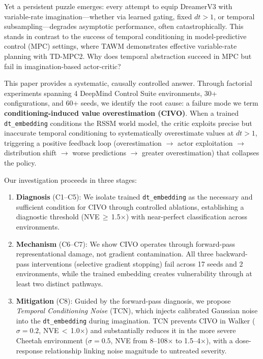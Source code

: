 \documentclass[10pt,letterpaper]{article}
\begin{document}
Yet a persistent puzzle emerges: every attempt to equip DreamerV3 with variable-rate imagination---whether via learned gating, fixed $dt>1$, or temporal subsampling---degrades asymptotic performance, often catastrophically.
This stands in contrast to the success of temporal conditioning in model-predictive control (MPC) settings, where TAWM \cite{nhu2025tawm} demonstrates effective variable-rate planning with TD-MPC2.
Why does temporal abstraction succeed in MPC but fail in imagination-based actor-critic?

This paper provides a systematic, causally controlled answer.
Through factorial experiments spanning 4 DeepMind Control Suite environments, 30+ configurations, and 60+ seeds, we identify the root cause: a failure mode we term \textbf{conditioning-induced value overestimation (CIVO)}.
When a trained \texttt{dt\_embedding} conditions the RSSM world model, the critic exploits precise but inaccurate temporal conditioning to systematically overestimate values at $dt>1$, triggering a positive feedback loop (overestimation $\to$ actor exploitation $\to$ distribution shift $\to$ worse predictions $\to$ greater overestimation) that collapses the policy.

Our investigation proceeds in three stages:
\begin{enumerate}[leftmargin=*,nosep]
    \item \textbf{Diagnosis} (C1--C5): We isolate trained \texttt{dt\_embedding} as the necessary and sufficient condition for CIVO through controlled ablations, establishing a diagnostic threshold (NVE\,$\geq$\,1.5$\times$) with near-perfect classification across environments.
    \item \textbf{Mechanism} (C6--C7): We show CIVO operates through forward-pass representational damage, not gradient contamination. All three backward-pass interventions (selective gradient stopping) fail across 17 seeds and 2 environments, while the trained embedding creates vulnerability through at least two distinct pathways.
    \item \textbf{Mitigation} (C8): Guided by the forward-pass diagnosis, we propose \emph{Temporal Conditioning Noise} (TCN), which injects calibrated Gaussian noise into the \texttt{dt\_embedding} during imagination. TCN prevents CIVO in Walker ($\sigma=0.2$, NVE\,$<$\,1.0$\times$) and substantially reduces it in the more severe Cheetah environment ($\sigma=0.5$, NVE from 8--108$\times$ to 1.5--4$\times$), with a dose-response relationship linking noise magnitude to untreated severity.
\end{enumerate}
\end{document}
